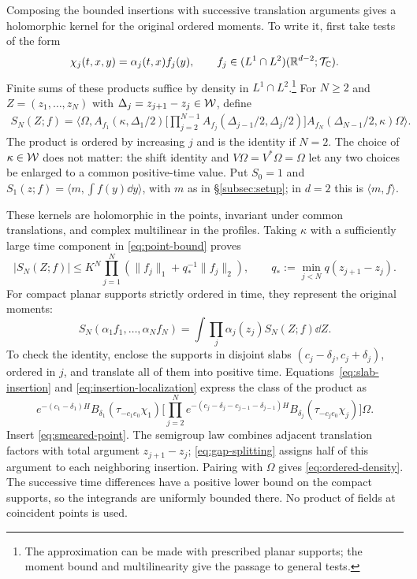 Composing the bounded insertions with successive translation
arguments gives a holomorphic kernel for the original ordered
moments. To write it, first take tests of the form
\begin{equation}
 \chi_j(t,x,y)=\alpha_j(t,x)f_j(y),\qquad
 f_j\in(L^1\cap L^2)(\mathbb{R}^{d-2};\mathcal{T}_{\mathbb{C}}).
\end{equation}
Finite sums of these products suffice by density in $L^1\cap L^2$.\footnote{The
approximation can be made with prescribed planar supports; the moment
bound and multilinearity give the passage to general tests.}
For $N\geq2$ and $Z=(z_1,\dots,z_N)$ with
$\Delta_j=z_{j+1}-z_j\in\mathcal{W}$, define
\begin{equation}\label{eq:ordered-kernel}
\begin{split}
 S_N(Z;f)=\big\langle\Omega,
 A_{f_1}(\kappa,\Delta_1/2)
 \Big[\prod_{j=2}^{N-1}A_{f_j}(\Delta_{j-1}/2,\Delta_j/2)\Big]
 A_{f_N}(\Delta_{N-1}/2,\kappa)\Omega\big\rangle.
\end{split}
\end{equation}
The product is ordered by increasing $j$ and is the identity if $N=2$.
The choice of $\kappa\in\mathcal{W}$ does not matter: the shift identity and
$V\Omega=V^*\Omega=\Omega$ let any two choices be enlarged to a common
positive-time value. Put $S_0=1$ and
$S_1(z;f)=\langle m,\int f(y)\dd y\rangle$, with $m$ as in
\S\ref{subsec:setup}; in $d=2$ this is $\langle m,f\rangle$.

These kernels are holomorphic in the points, invariant under common
translations, and complex multilinear in the profiles. Taking
$\kappa$ with a sufficiently large time component in
\eqref{eq:point-bound} proves
\begin{equation}\label{eq:kernel-estimate}
 |S_N(Z;f)|\leq K^N\prod_{j=1}^N
      \left(\|f_j\|_1+q_*^{-1}\|f_j\|_2\right),
 \qquad q_*:=\min_{j<N}q(z_{j+1}-z_j).
\end{equation}
For compact planar supports strictly ordered in time, they represent
the original moments:
\begin{equation}\label{eq:ordered-density}
 S_N(\alpha_1f_1,\dots,\alpha_Nf_N)
 =\int\prod_j\alpha_j(z_j)S_N(Z;f)\dd Z.
\end{equation}
To check the identity, enclose the supports in disjoint slabs
$(c_j-\delta_j,c_j+\delta_j)$, ordered in $j$, and translate all of
them into positive time. Equations~\eqref{eq:slab-insertion} and
\eqref{eq:insertion-localization} express the class of the product as
\begin{equation}\label{eq:ordered-product}
 e^{-(c_1-\delta_1)H}B_{\delta_1}(\tau_{-c_1e_0}\chi_1)
 \Big[\prod_{j=2}^N e^{-(c_j-\delta_j-c_{j-1}-\delta_{j-1})H}
 B_{\delta_j}(\tau_{-c_je_0}\chi_j)\Big]\Omega.
\end{equation}
Insert \eqref{eq:smeared-point}. The semigroup law combines adjacent
translation factors with total argument $z_{j+1}-z_j$;
\eqref{eq:gap-splitting} assigns half of this argument to each
neighboring insertion. Pairing with $\Omega$ gives
\eqref{eq:ordered-density}. The successive time differences have a
positive lower bound on the compact supports, so the integrands are
uniformly bounded there. No product of fields at coincident points is used.

